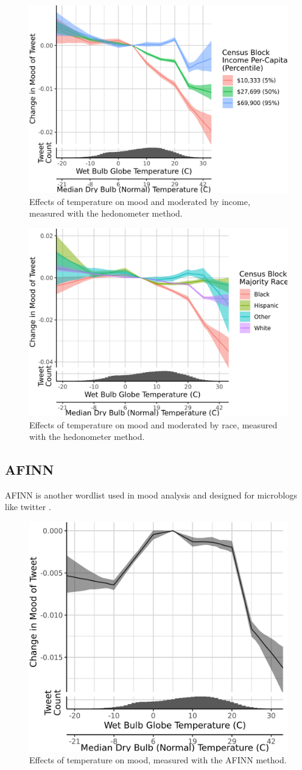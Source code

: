 \documentclass[9pt,twoside,lineno]{pnas-new}
\begin{document}
\begin{figure}[H]
  \centering
  \includegraphics[width=0.6\linewidth]{../../../res/hedono-wbgt-income.png}
  \caption{Effects of temperature on mood and moderated by income, measured with the hedonometer method.}
\end{figure}

\begin{figure}[H]
  \centering
  \includegraphics[width=0.6\linewidth]{../../../res/hedono-wbgt-race_q.png}
  \caption{Effects of temperature on mood and moderated by race, measured with the hedonometer method.}
\end{figure}

\newpage
\subsection*{AFINN}

AFINN is another wordlist used in mood analysis and designed for microblogs like twitter \cite{nielsen2011new}.

\begin{figure}[H]
  \centering
  \includegraphics[width=0.6\linewidth]{../../../res/afinn-wbgt.png}
  \caption{Effects of temperature on mood, measured with the AFINN method.}
\end{figure}
\end{document}
